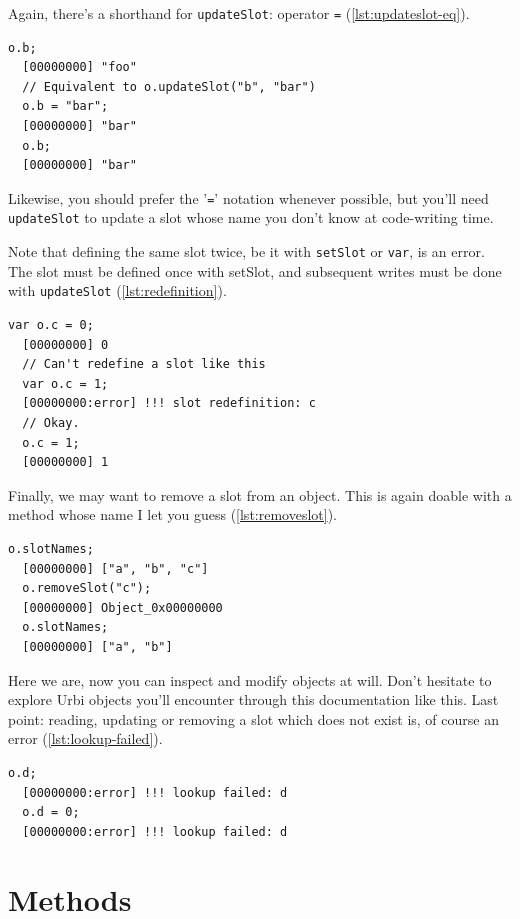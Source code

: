 \documentclass[openright,twoside,12pt]{report}
\newcommand{\urbi}{Urbi\xspace}
\newcommand{\lst}[1]{\autoref{lst:#1}}
\begin{document}
Again, there's a shorthand for \texttt{updateSlot}: operator
\texttt{=} (\lst{updateslot-eq}).

\begin{lstlisting}[caption=Updating a slot with '\texttt{=}',
  label=lst:updateslot-eq]
  o.b;
  [00000000] "foo"
  // Equivalent to o.updateSlot("b", "bar")
  o.b = "bar";
  [00000000] "bar"
  o.b;
  [00000000] "bar"
\end{lstlisting}

Likewise, you should prefer the '\texttt{=}' notation whenever
possible, but you'll need \texttt{updateSlot} to update a slot whose
name you don't know at code-writing time.

Note that defining the same slot twice, be it with \texttt{setSlot} or
\texttt{var}, is an error. The slot must be defined once with setSlot,
and subsequent writes must be done with \texttt{updateSlot}
(\lst{redefinition}).

\begin{lstlisting}[caption=Defining a slot twice is an error,
  label=lst:redefinition]
  var o.c = 0;
  [00000000] 0
  // Can't redefine a slot like this
  var o.c = 1;
  [00000000:error] !!! slot redefinition: c
  // Okay.
  o.c = 1;
  [00000000] 1
\end{lstlisting}

Finally, we may want to remove a slot from an object. This is again
doable with a method whose name I let you guess (\lst{removeslot}).

\begin{lstlisting}[caption=Removing a slot, label=lst:removeslot]
  o.slotNames;
  [00000000] ["a", "b", "c"]
  o.removeSlot("c");
  [00000000] Object_0x00000000
  o.slotNames;
  [00000000] ["a", "b"]
\end{lstlisting}

Here we are, now you can inspect and modify objects at will. Don't
hesitate to explore \urbi objects you'll encounter through this
documentation like this. Last point: reading, updating or removing a
slot which does not exist is, of course an error
(\lst{lookup-failed}).

\begin{lstlisting}[caption=Manipulating existent slot is an error,
  label=lst:lookup-failed]
  o.d;
  [00000000:error] !!! lookup failed: d
  o.d = 0;
  [00000000:error] !!! lookup failed: d
\end{lstlisting}

\section{Methods}
\end{document}
